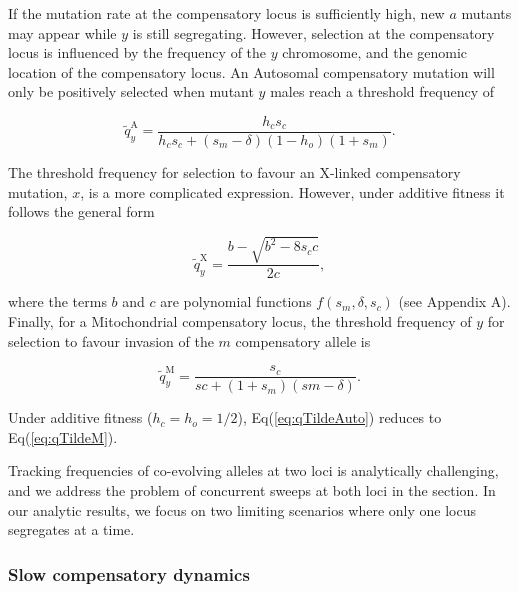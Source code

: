 \documentclass{article}
\begin{document}
\noindent If the mutation rate at the compensatory locus is sufficiently high, new $a$ mutants may appear while $y$ is still segregating. However, selection at the compensatory locus is influenced by the frequency of the $y$ chromosome, and the genomic location of the compensatory locus. An Autosomal compensatory mutation will only be positively selected when mutant $y$ males reach a threshold frequency of

\begin{equation} \label{eq:qTildeAuto} 
	\tilde{q}_y^{\text{A}} = \frac{h_c s_c} {h_c s_c + (s_m - \delta)(1 - h_o)(1+s_m)}.
\end{equation}

\noindent The threshold frequency for selection to favour an X-linked compensatory mutation, $x$, is a more complicated expression. However, under additive fitness it follows the general form

\begin{equation} \label{eq:qTildeX} 
	\tilde{q}_y^{\text{X}} = \frac{b - \sqrt{b^2 - 8 s_c c}} {2 c},
\end{equation}

\noindent where the terms $b$ and $c$ are polynomial functions $f(s_m,\delta,s_c)$ (see Appendix A). Finally, for a Mitochondrial compensatory locus, the threshold frequency of $y$ for selection to favour invasion of the $m$ compensatory allele is

\begin{equation} \label{eq:qTildeM} 
	\tilde{q}_y^{\text{M}} = \frac{s_c} {sc + (1 + s_m) (sm - \delta)}.
\end{equation}

\noindent Under additive fitness ($h_c = h_o = 1/2$), Eq(\ref{eq:qTildeAuto}) reduces to Eq(\ref{eq:qTildeM}).
\bigskip

Tracking frequencies of co-evolving alleles at two loci is analytically challenging, and we address the problem of concurrent sweeps at both loci in the  section. In our analytic results, we focus on two limiting scenarios where only one locus segregates at a time.


\subsubsection*{Slow compensatory dynamics} 
\end{document}
